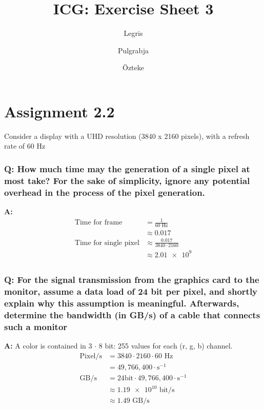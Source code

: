 \documentclass{article}
\title {ICG: Exercise Sheet 3}
\author{
    Legris \and
    Pulgrabja \and
    \"Ozteke
}
\begin{document}
    \maketitle

    \section*{Assignment 2.2}
        Consider a display with a UHD resolution (3840 x 2160 pixels),
        with a refresh rate of 60 Hz
        \subsubsection*{Q: How much time may the generation of a single pixel at most
                take? For the sake of simplicity, ignore any potential overhead in the
                process of the pixel generation.}

            \textbf{A:}
            \begin{align*}
                \text{Time for frame} &= \frac 1{60 \text{ Hz}}\\
                    &\approx 0.017 \\
                \text{Time for single pixel} &\approx \frac{0.017}{3840 \cdot 2160}\\
                    &\approx \num{2.01e+9}\\
            \end{align*}
        
        \subsubsection*{Q: For the signal transmission from the graphics card to the
                monitor, assume a data load of 24 bit per pixel, and shortly explain
                why this assumption is meaningful. Afterwards, determine the bandwidth
                (in GB/s) of a cable that connects such a monitor}
            
            \textbf{A:}
            A color is contained in 3 \(\cdot\) 8 bit: 255 values for each (r, g, b) channel.\\
            \begin{align*}
                \text{Pixel}/\text{s} &= 3840 \cdot 2160 \cdot 60 \text{ Hz}\\
                    &= 49,766,400 \cdot \text{s}^{-1}\\
                \text{GB}/\text{s} &= 24 \text{bit} \cdot 49,766,400 \cdot \text{s}^{-1}\\
                    &\approx \num{1.19e+10} \text{ bit} / \text{s}\\
                    &\approx 1.49 \text{ GB} / \text{s}
            \end{align*}
\end{document}
